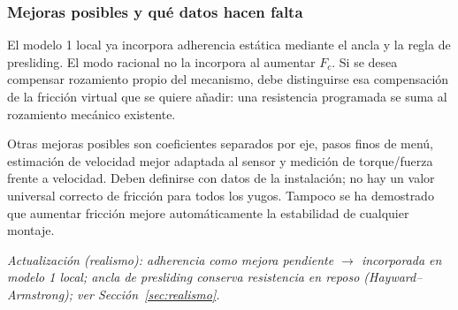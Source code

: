 \documentclass[11pt,a4paper]{article}
\begin{document}
\subsubsection{Mejoras posibles y qué datos hacen falta}
El modelo 1 local ya incorpora adherencia estática mediante el ancla y la regla de presliding. El modo racional no la incorpora al aumentar $F_c$. Si se desea compensar rozamiento propio del mecanismo, debe distinguirse esa compensación de la fricción virtual que se quiere añadir: una resistencia programada se suma al rozamiento mecánico existente.

Otras mejoras posibles son coeficientes separados por eje, pasos finos de menú, estimación de velocidad mejor adaptada al sensor y medición de torque/fuerza frente a velocidad. Deben definirse con datos de la instalación; no hay un valor universal correcto de fricción para todos los yugos. Tampoco se ha demostrado que aumentar fricción mejore automáticamente la estabilidad de cualquier montaje.

\textit{Actualización (realismo): adherencia como mejora pendiente $\rightarrow$ incorporada en modelo 1 local; ancla de presliding conserva resistencia en reposo (Hayward--Armstrong); ver Sección~\ref{sec:realismo}.}
\end{document}

